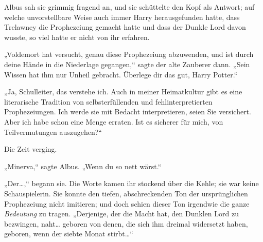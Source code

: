 Albus sah sie grimmig fragend an, und sie schüttelte den Kopf als Antwort; auf welche unvorstellbare Weise auch immer Harry herausgefunden hatte, dass Trelawney die Prophezeiung gemacht hatte und dass der Dunkle Lord davon wusste, so viel hatte er nicht von ihr erfahren.

„Voldemort hat versucht, genau diese Prophezeiung abzuwenden, und ist durch deine Hände in die Niederlage gegangen,“ sagte der alte Zauberer dann. „Sein Wissen hat ihm nur Unheil gebracht. Überlege dir das gut, Harry Potter.“

„Ja, Schulleiter, das verstehe ich. Auch in meiner Heimatkultur gibt es eine literarische Tradition von selbsterfüllenden und fehlinterpretierten Prophezeiungen. Ich werde sie mit Bedacht interpretieren, seien Sie versichert. Aber ich habe schon eine Menge erraten. Ist es sicherer für mich, von Teilvermutungen auszugehen?“

Die Zeit verging.

„Minerva,“ sagte Albus. „Wenn du so nett wärst.“

„Der…,“ begann sie. Die Worte kamen ihr stockend über die Kehle; sie war keine Schauspielerin. Sie konnte den tiefen, abschreckenden Ton der ursprünglichen Prophezeiung nicht imitieren; und doch schien dieser Ton irgendwie die ganze \emph{Bedeutung} zu tragen. „Derjenige, der die Macht hat, den Dunklen Lord zu bezwingen, naht… geboren von denen, die sich ihm dreimal widersetzt haben, geboren, wenn der siebte Monat stirbt…“

